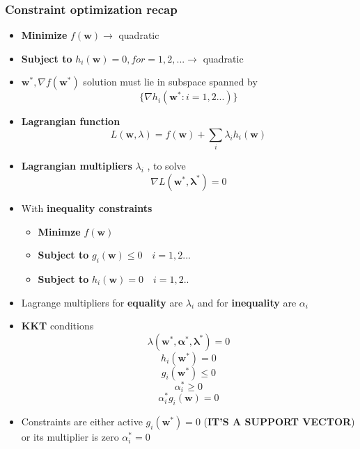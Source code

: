 \documentclass[12pt]{article} %
\begin{document}
\subsubsection{Constraint optimization recap}
\begin{itemize}
\item \textbf{Minimize} $f(\bm{w}) \rightarrow$ quadratic
\item \textbf{Subject to} $h_i(\bm{w})=0, for=1,2,...\rightarrow$ quadratic
\item $\bm{w^*}, \nabla f(\bm{w^*})$ solution must lie in subspace spanned by $$ \{\nabla h_i(\bm{w^*}:i=1,2...) \}$$

\item \textbf{Lagrangian function}
$$ L(\bm{w},\lambda)= f(\bm{w})+\sum \limits_i \lambda_ih_i(\bm{w})$$

\item \textbf{Lagrangian multipliers} $\lambda_i$ , to solve 
$$ \nabla L (\bm{w^*}, \bm{\lambda^*})=0$$

\item With \textbf{inequality constraints}
\begin{itemize}
\item \textbf{Minimze} $f(\bm{w})$
\item \textbf{Subject to} $g_i(\bm{w}) \leq 0 \quad i=1,2...$
\item \textbf{Subject to} $h_i(\bm{w}) = 0 \quad i=1,2..$
\end{itemize}

\item Lagrange multipliers for \textbf{equality} are $\lambda_i$ and for \textbf{inequality} are $\alpha_i$

\item \textbf{KKT} conditions
$$\lambda(\bm{w^*,\alpha^* , \lambda^*})=0$$
$$ h_i(\bm{w^*})=0$$
$$ g_i(\bm{w^*}) \leq 0$$
$$ \alpha^*_i \geq 0 $$
$$ \alpha^*_ig_i(\bm{w})=0$$

\item Constraints are either active $g_i(\bm{w^*})=0$ (\textbf{IT'S A SUPPORT VECTOR}) or its multiplier is zero $\alpha^*_i=0$
\end{itemize}
\end{document}
